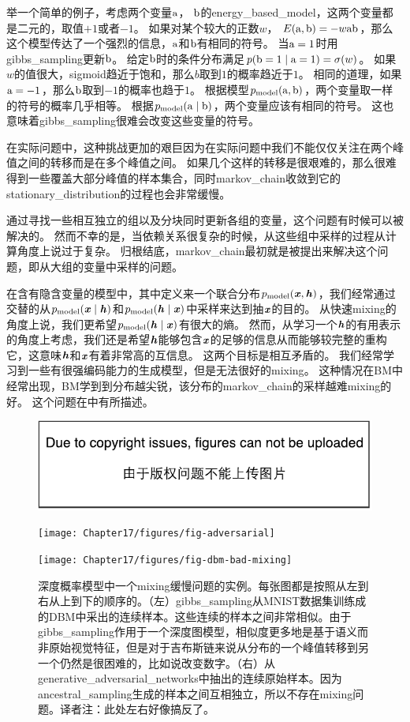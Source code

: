 举一个简单的例子，考虑两个变量$\mathrm{a}$， $\mathrm{b}$的\gls{energy_based_model}，这两个变量都是二元的，取值$+1$或者$-1$。
如果对某个较大的正数$w$， $E(\mathrm{a},\mathrm{b}) = - w \mathrm{a} \mathrm{b}$，那么这个模型传达了一个强烈的信息，$\mathrm{a}$和$\mathrm{b}$有相同的符号。
当$\mathrm{a}=1$时用\gls{gibbs_sampling}更新$\mathrm{b}$。
给定$\mathrm{b}$时的条件分布满足$p(\mathrm{b}=1\mid \mathrm{a}=1) = \sigma(w)$。
如果$w$的值很大，\gls{sigmoid}趋近于饱和，那么$b$取到$1$的概率趋近于$1$。
相同的道理，如果$\mathrm{a}=-1$，那么$\mathrm{b}$取到$-1$的概率也趋于$1$。
根据模型$p_{\text{model}}(\mathrm{a},\mathrm{b})$，两个变量取一样的符号的概率几乎相等。
根据$p_{\text{model}}(\mathrm{a}\mid \mathrm{b})$，两个变量应该有相同的符号。
这也意味着\gls{gibbs_sampling}很难会改变这些变量的符号。

在实际问题中，这种挑战更加的艰巨因为在实际问题中我们不能仅仅关注在两个峰值之间的转移而是在多个峰值之间。
如果几个这样的转移是很艰难的，那么很难得到一些覆盖大部分峰值的样本集合，同时\gls{markov_chain}收敛到它的\gls{stationary_distribution}的过程也会非常缓慢。

通过寻找一些相互独立的组以及分块同时更新各组的变量，这个问题有时候可以被解决的。
然而不幸的是，当依赖关系很复杂的时候，从这些组中采样的过程从计算角度上说过于复杂。
归根结底，\gls{markov_chain}最初就是被提出来解决这个问题，即从大组的变量中采样的问题。

在含有隐含变量的模型中，其中定义来一个联合分布$p_{\text{model}}(\boldsymbol{\mathit{x}},\boldsymbol{\mathit{h}})$，我们经常通过交替的从$p_{\text{model}}(\boldsymbol{\mathit{x}}\mid \boldsymbol{\mathit{h}})$和$p_{\text{model}}(\boldsymbol{\mathit{h}}\mid \boldsymbol{\mathit{x}})$中采样来达到抽$\boldsymbol{\mathit{x}}$的目的。
从快速\gls{mixing}的角度上说，我们更希望$p_{\text{model}}(\boldsymbol{\mathit{h}}\mid \boldsymbol{\mathit{x}})$有很大的熵。
然而，从学习一个$\boldsymbol{\mathit{h}}$的有用表示的角度上考虑，我们还是希望$\boldsymbol{\mathit{h}}$能够包含$\boldsymbol{\mathit{x}}$的足够的信息从而能够较完整的重构它，这意味$\boldsymbol{\mathit{h}}$和$\boldsymbol{\mathit{x}}$有着非常高的互信息。
这两个目标是相互矛盾的。
我们经常学习到一些有很强编码能力的生成模型，但是无法很好的\gls{mixing}。
这种情况在\gls{BM}中经常出现，\gls{BM}学到到分布越尖锐，该分布的\gls{markov_chain}的采样越难\gls{mixing}的好。
这个问题在中有所描述。

\begin{figure}[!htb]
\ifOpenSource
\centerline{\includegraphics{figure.pdf}}
\else
	\centerline{\texttt{[image: Chapter17/figures/fig-adversarial]}}
	\centerline{\texttt{[image: Chapter17/figures/fig-dbm-bad-mixing]}}	
\fi
	\caption{深度概率模型中一个\gls{mixing}缓慢问题的实例。每张图都是按照从左到右从上到下的顺序的。（左）\gls{gibbs_sampling}从MNIST数据集训练成的\gls{DBM}中采出的连续样本。这些连续的样本之间非常相似。由于\gls{gibbs_sampling}作用于一个深度图模型，相似度更多地是基于语义而非原始视觉特征，但是对于吉布斯链来说从分布的一个峰值转移到另一个仍然是很困难的，比如说改变数字。（右）从\gls{generative_adversarial_networks}中抽出的连续原始样本。因为\gls{ancestral_sampling}生成的样本之间互相独立，所以不存在\gls{mixing}问题。{译者注：此处左右好像搞反了。}}
	\label{fig:chap17_fig-dbm-bad-mixing}
\end{figure}


